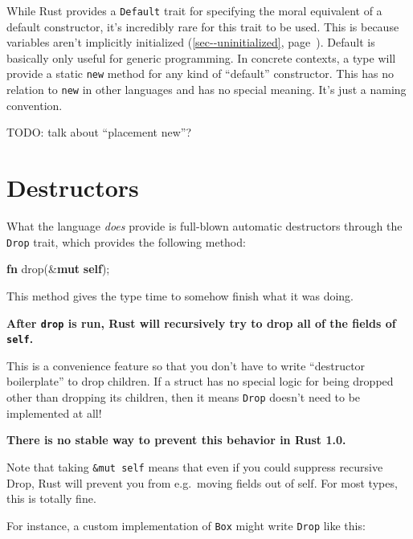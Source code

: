 \documentclass[a4paper,]{book}
\renewcommand*{\hyperlink}[2]{%
 #2 (\autoref{#1}, page~\pageref{#1})}
\newenvironment{Shaded}{\begin{snugshade}}{\end{snugshade}}
\newcommand{\KeywordTok}[1]{\textcolor[rgb]{0.13,0.29,0.53}{\textbf{{#1}}}}
\newcommand{\NormalTok}[1]{{#1}}
\begin{document}
While Rust provides a \texttt{Default} trait for specifying the moral
equivalent of a default constructor, it's incredibly rare for this trait
to be used. This is because variables
\protect\hyperlink{sec--uninitialized}{aren't implicitly initialized}.
Default is basically only useful for generic programming. In concrete
contexts, a type will provide a static \texttt{new} method for any kind
of ``default'' constructor. This has no relation to \texttt{new} in
other languages and has no special meaning. It's just a naming
convention.

TODO: talk about ``placement new''?

\section{Destructors}\label{sec--destructors}

What the language \emph{does} provide is full-blown automatic
destructors through the \texttt{Drop} trait, which provides the
following method:

\begin{Shaded}
\begin{Highlighting}[]
\KeywordTok{fn} \NormalTok{drop(&}\KeywordTok{mut} \KeywordTok{self}\NormalTok{);}
\end{Highlighting}
\end{Shaded}

This method gives the type time to somehow finish what it was doing.

\textbf{After \texttt{drop} is run, Rust will recursively try to drop
all of the fields of \texttt{self}.}

This is a convenience feature so that you don't have to write
``destructor boilerplate'' to drop children. If a struct has no special
logic for being dropped other than dropping its children, then it means
\texttt{Drop} doesn't need to be implemented at all!

\textbf{There is no stable way to prevent this behavior in Rust 1.0.}

Note that taking \texttt{\&mut\ self} means that even if you could
suppress recursive Drop, Rust will prevent you from e.g.~moving fields
out of self. For most types, this is totally fine.

For instance, a custom implementation of \texttt{Box} might write
\texttt{Drop} like this:
\end{document}
